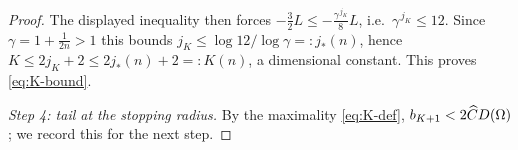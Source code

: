 \begin{proof}
The displayed inequality then forces
$-\tfrac32 L\le-\tfrac{\gamma^{\,j_K}}{8}L$, i.e.\
$\gamma^{\,j_K}\le12$.
Since $\gamma=1+\tfrac1{2n}>1$ this bounds
$j_K\le\log12/\log\gamma=:j_*(n)$, hence
$K\le2j_K+2\le2j_*(n)+2=:K(n)$, a dimensional constant. This proves
\eqref{eq:K-bound}.

\emph{Step 4: tail at the stopping radius.} By the maximality
\eqref{eq:K-def}, $b_{K+1}<2\widehat C D(\Omega)$; we record this for the next
step.


\end{proof}
